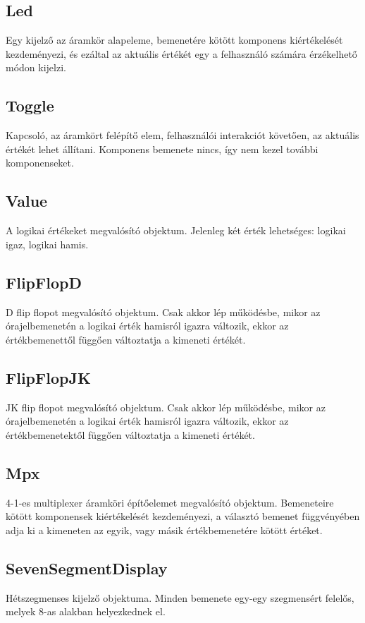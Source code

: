 \subsection{\bf Led}
Egy kijelző az áramkör alapeleme, bemenetére kötött komponens kiértékelését kezdeményezi, és ezáltal az aktuális értékét egy a felhasználó számára érzékelhető módon kijelzi.

\subsection{\bf Toggle}
Kapcsoló, az áramkört felépítő elem, felhasználói interakciót követően, az aktuális értékét lehet állítani. Komponens bemenete nincs, így nem kezel további komponenseket.

\subsection{\bf Value}
A logikai értékeket megvalósító objektum. Jelenleg két érték lehetséges: logikai igaz, logikai hamis.

\subsection{\bf FlipFlopD}
D flip flopot megvalósító objektum. Csak akkor lép működésbe, mikor az órajelbemenetén a logikai érték hamisról igazra változik, ekkor az értékbemenettől függően változtatja a kimeneti értékét.

\subsection{\bf FlipFlopJK}
JK flip flopot megvalósító objektum. Csak akkor lép működésbe, mikor az órajelbemenetén a logikai érték hamisról igazra változik, ekkor az értékbemenetektől függően változtatja a kimeneti értékét.

\subsection{\bf Mpx}
4-1-es multiplexer áramköri építőelemet megvalósító objektum. Bemeneteire kötött komponensek kiértékelését kezdeményezi, a választó bemenet függvényében adja ki a kimeneten az egyik, vagy másik értékbemenetére kötött értéket.

\subsection{\bf SevenSegmentDisplay}
Hétszegmenses kijelző objektuma. Minden bemenete egy-egy szegmensért felelős, melyek 8-as alakban helyezkednek el.

